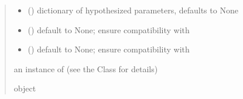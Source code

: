 \documentclass[letterpaper,10pt,english]{sphinxmanual}
\begin{document}
\begin{fulllineitems}
\begin{quote}
\begin{description}
\begin{itemize}
\item {} 
\sphinxAtStartPar
{} (\sphinxstyleliteralemphasis{\sphinxupquote{, }}) \textendash{} dictionary of hypothesized parameters, defaults to None

\item {} 
\sphinxAtStartPar
{} () \textendash{} default to None; ensure compatibility with 

\item {} 
\sphinxAtStartPar
{} () \textendash{} default to None; ensure compatibility with 

\end{itemize}

\sphinxAtStartPar
an instance of  (see the Class for details)

\sphinxAtStartPar
object

\end{description}\end{quote}

\end{fulllineitems}

\end{document}
